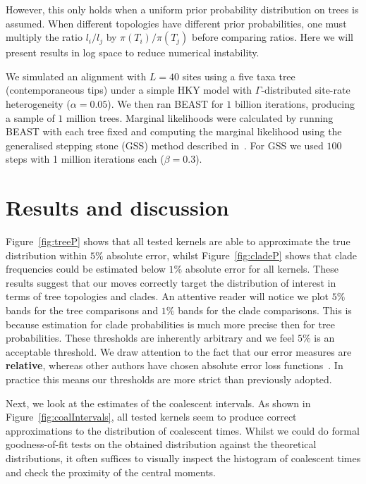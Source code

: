 However, this only holds when a uniform prior probability distribution on trees is assumed. 
When different topologies have different prior probabilities, one must multiply the ratio $l_i/l_j$ by $\pi(T_i)/\pi(T_j)$ before comparing ratios.
Here we will present results in log space to reduce numerical instability.

We simulated an alignment with $L= 40$ sites using a five taxa tree (contemporaneous tips) under a simple HKY model with $\Gamma$-distributed site-rate heterogeneity ($\alpha = 0.05$).
We then ran BEAST for $1$ billion iterations, producing a sample of $1$ million trees.
Marginal likelihoods were calculated by running BEAST with each tree fixed and computing the marginal likelihood using the generalised stepping stone (GSS) method described in~\cite{Baele2015}.
For GSS we used $100$ steps with 1 million iterations each ($\beta = 0.3$).

\section*{Results and discussion}

Figure~\ref{fig:treeP} shows that all tested kernels are able to approximate the true distribution within $5\%$ absolute error, whilst Figure~\ref{fig:cladeP} shows that clade frequencies could be estimated below $1\%$ absolute error for all kernels.
These results suggest that our moves correctly target the distribution of interest in terms of tree topologies and clades.
An attentive reader will notice we plot $5\%$ bands for the tree comparisons and $1\%$ bands for the clade comparisons. 
This is because estimation for clade probabilities is much more precise then for tree probabilities.
These thresholds are inherently arbitrary and we feel $5\%$ is an acceptable threshold.
We draw attention to the fact that our error measures are \textbf{relative}, whereas other authors have chosen absolute error loss functions~\citep{Hoehna2008, Lakner2008}.
In practice this means our thresholds are more strict than previously adopted.

Next, we look at the estimates of the coalescent intervals.
As shown in Figure~\ref{fig:coalIntervals}, all tested kernels seem to produce correct approximations to the distribution of coalescent times.
Whilst we could do formal goodness-of-fit tests on the obtained distribution against the theoretical distributions, it often suffices to visually inspect the histogram of coalescent times and check the proximity of the central moments.

